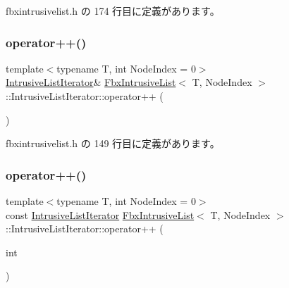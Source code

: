  fbxintrusivelist.\+h の 174 行目に定義があります。

\mbox{\label{class_fbx_intrusive_list_1_1_intrusive_list_iterator_a2a0d6f2ae7ee5c706f7416555c1961e7}} 
\subsubsection{\texorpdfstring{operator++()}{operator++()}\hspace{0.1cm}{\footnotesize\ttfamily [1/2]}}
{\footnotesize\ttfamily template$<$typename T, int Node\+Index = 0$>$ \\
\hyperlink{class_fbx_intrusive_list_1_1_intrusive_list_iterator}{Intrusive\+List\+Iterator}\& \hyperlink{class_fbx_intrusive_list}{Fbx\+Intrusive\+List}$<$ T, Node\+Index $>$\+::Intrusive\+List\+Iterator\+::operator++ (\begin{DoxyParamCaption}{ }\end{DoxyParamCaption})\hspace{0.3cm}{\ttfamily [inline]}}



 fbxintrusivelist.\+h の 149 行目に定義があります。

\mbox{\label{class_fbx_intrusive_list_1_1_intrusive_list_iterator_adb4a679670dae7314e4127751d583b4a}} 
\subsubsection{\texorpdfstring{operator++()}{operator++()}\hspace{0.1cm}{\footnotesize\ttfamily [2/2]}}
{\footnotesize\ttfamily template$<$typename T, int Node\+Index = 0$>$ \\
const \hyperlink{class_fbx_intrusive_list_1_1_intrusive_list_iterator}{Intrusive\+List\+Iterator} \hyperlink{class_fbx_intrusive_list}{Fbx\+Intrusive\+List}$<$ T, Node\+Index $>$\+::Intrusive\+List\+Iterator\+::operator++ (\begin{DoxyParamCaption}\item[{int}]{ }\end{DoxyParamCaption})\hspace{0.3cm}{\ttfamily [inline]}}




